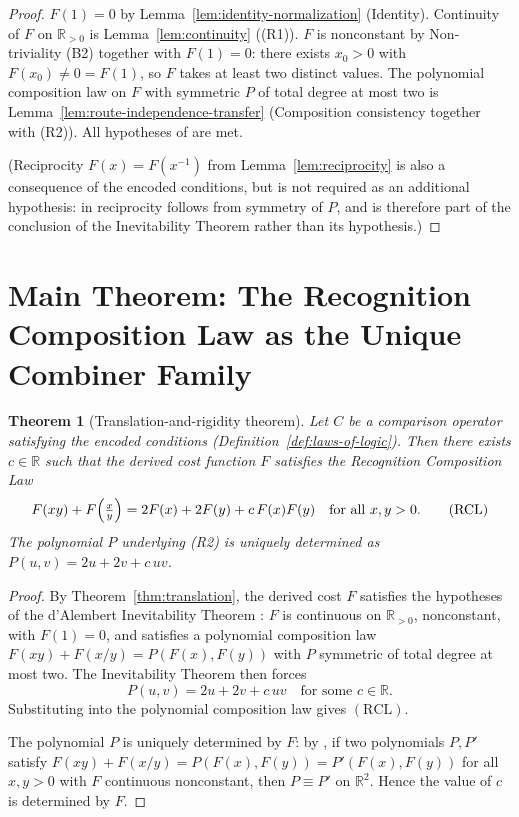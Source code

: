 \documentclass[11pt,a4paper]{article}
\newtheorem{theorem}{Theorem}
\theoremstyle{definition}
\theoremstyle{remark}
\begin{document}
\begin{proof}
$F(1) = 0$ by Lemma~\ref{lem:identity-normalization} (Identity).
Continuity of $F$ on $\mathbb{R}_{>0}$ is
Lemma~\ref{lem:continuity} ((R1)). $F$ is nonconstant by Non-triviality
(B2) together with $F(1) = 0$: there exists $x_0 > 0$ with
$F(x_0) \neq 0 = F(1)$, so $F$ takes at least two distinct values. The
polynomial composition law on $F$ with symmetric $P$ of total degree at
most two is Lemma~\ref{lem:route-independence-transfer} (Composition
consistency together with (R2)). All hypotheses of
\cite[Theorem~3]{WashburnZlatanovicAllahyarov2026} are met.

(Reciprocity $F(x) = F(x^{-1})$ from
Lemma~\ref{lem:reciprocity} is also a consequence of the encoded
conditions, but is not required as an additional hypothesis: in
\cite[Lemma~1]{WashburnZlatanovicAllahyarov2026} reciprocity follows from
symmetry of $P$, and is therefore part of the conclusion of the
Inevitability Theorem rather than its hypothesis.)
\end{proof}

\section{Main Theorem: The Recognition Composition Law as the Unique Combiner Family}\label{sec:main}

\begin{theorem}[Translation-and-rigidity theorem]
\label{thm:main}
Let $C$ be a comparison operator satisfying the encoded conditions
(Definition~\ref{def:laws-of-logic}). Then there exists $c \in \mathbb{R}$
such that the derived cost function $F$ satisfies the Recognition
Composition Law
\[
F(xy) + F\!\left(\tfrac{x}{y}\right) = 2F(x) + 2F(y) + c\,F(x)F(y)
\quad \text{for all } x, y > 0. \tag{$\mathrm{RCL}$}
\]
The polynomial $P$ underlying (R2) is uniquely determined as
$P(u, v) = 2u + 2v + c\,uv$.
\end{theorem}

\begin{proof}
By Theorem~\ref{thm:translation}, the derived cost $F$ satisfies the
hypotheses of the d'Alembert Inevitability Theorem
\cite[Theorem~3]{WashburnZlatanovicAllahyarov2026}: $F$ is continuous on
$\mathbb{R}_{>0}$, nonconstant, with $F(1) = 0$, and satisfies a polynomial
composition law $F(xy) + F(x/y) = P(F(x), F(y))$ with $P$ symmetric of total
degree at most two. The Inevitability Theorem then forces
\[
P(u, v) = 2u + 2v + c\,uv \quad \text{for some } c \in \mathbb{R}.
\]
Substituting into the polynomial composition law gives $(\mathrm{RCL})$.

The polynomial $P$ is uniquely determined by $F$: by
\cite[Corollary~5]{WashburnZlatanovicAllahyarov2026}, if two polynomials
$P, P'$ satisfy $F(xy) + F(x/y) = P(F(x), F(y)) = P'(F(x), F(y))$ for all
$x, y > 0$ with $F$ continuous nonconstant, then $P \equiv P'$ on
$\mathbb{R}^2$. Hence the value of $c$ is determined by $F$.
\end{proof}
\end{document}
